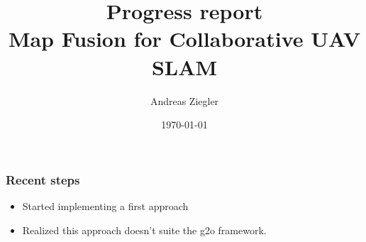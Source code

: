 \documentclass[xcolor={x11names}]{beamer}
\title[Map Fusion for Collaborative UAV SLAM]{Progress report\\Map Fusion for Collaborative UAV SLAM} %
\author{Andreas Ziegler} %
\institute[V4RL@ETHZ] %
{
  \texttt{[image: ../V4RLLogo]} \\ETH Zurich \\ %
\medskip
\textit{anziegle@ethz.ch} %
}
\date{\today} %
\begin{document}
\begin{frame}
\titlepage %
\end{frame}





\begin{frame}
\frametitle{Recent steps}
\begin{itemize}
  \item Started implementing a first approach
  \item Realized this approach doesn't suite the g2o framework.
\end{itemize}
\end{frame}

\end{document}
